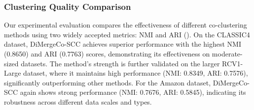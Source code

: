 \documentclass[journal]{IEEEtran}
\begin{document}
\subsubsection{Clustering Quality Comparison}
Our experimental evaluation compares the effectiveness of different co-clustering methods using two widely accepted metrics: NMI and ARI (). On the CLASSIC4 dataset, DiMergeCo-SCC achieves superior performance with the highest NMI (0.8650) and ARI (0.7763) scores, demonstrating its effectiveness on moderate-sized datasets. The method's strength is further validated on the larger RCV1-Large dataset, where it maintains high performance (NMI: 0.8349, ARI: 0.7576), significantly outperforming other methods. For the Amazon dataset, DiMergeCo-SCC again shows strong performance (NMI: 0.7676, ARI: 0.5845), indicating its robustness across different data scales and types.
\end{document}
